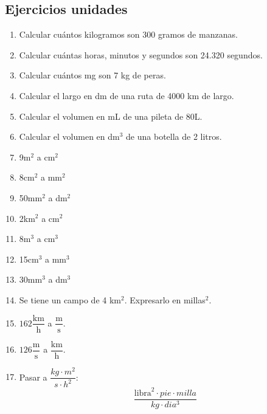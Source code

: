 \newpage
\subsection*{Ejercicios unidades}

\begin{enumerate}
\item Calcular cuántos kilogramos son  300 gramos de manzanas.

\item Calcular cuántas horas, minutos y segundos son 24.320 segundos.

\item Calcular cuántos mg son 7 kg de peras.

\item Calcular el largo en dm de una ruta de 4000 km de largo.

\item Calcular el volumen en mL de una pileta de 80L.

\item Calcular el volumen en dm$^3$ de una botella de 2 litros.

\item 9m$^2$ a cm$^2$

\item 8cm$^2$ a mm$^2$

\item 50mm$^2$ a dm$^2$

\item 2km$^2$ a cm$^2$

\item 8m$^3$ a cm$^3$

\item 15cm$^3$ a mm$^3$

\item 30mm$^3$ a dm$^3$

\item Se tiene un campo de 4 km$^2$. Expresarlo en millas$^2$.

\item $162 \dfrac{\text{km}}{\text{h}}$ a $\dfrac{\text{m}}{\text{s}}$.

\item $126 \dfrac{\text{m}}{\text{s}}$ a $\dfrac{\text{km}}{\text{h}}$.


\item Pasar a $\dfrac{kg \cdot m^2}{s\cdot h^2}$:
$$
\dfrac{\text{libra}^2 \cdot pie \cdot milla}{kg \cdot dia^3}
$$
\end{enumerate}


